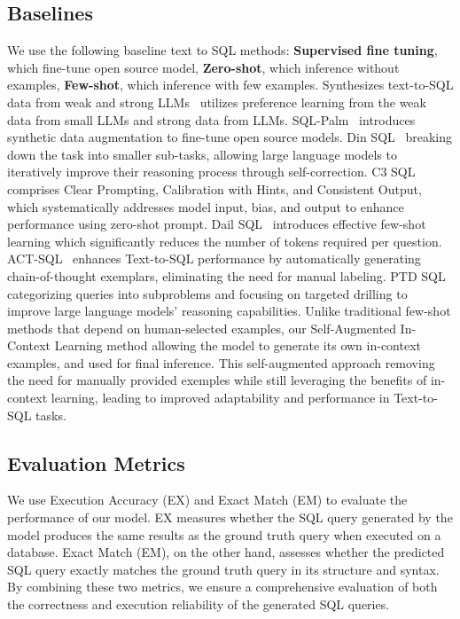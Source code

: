 \subsection{Baselines}
We use the following baseline text to SQL methods: \textbf{Supervised fine tuning}, which fine-tune open source model, \textbf{Zero-shot}, which inference without examples, \textbf{Few-shot}, which inference with few examples. Synthesizes text-to-SQL data from weak and strong LLMs~\cite{synthesize} utilizes preference learning from the weak data from small LLMs and strong data from LLMs. SQL-Palm~\cite{palm-sql} introduces synthetic data augmentation to fine-tune open source models. Din SQL~\cite{din} breaking down the task into smaller sub-tasks, allowing large language models to iteratively improve their reasoning process through self-correction. C3 SQL~\cite{c3_zeroshot} comprises  Clear Prompting, Calibration with Hints, and Consistent Output, which systematically addresses model input, bias, and output to enhance performance using zero-shot prompt. Dail SQL~\cite{dail_sql} introduces effective few-shot learning which significantly reduces the number of tokens required per question. ACT-SQL~\cite{act_sql} enhances Text-to-SQL performance by automatically generating chain-of-thought exemplars, eliminating the need for manual labeling. PTD SQL~\cite{ptd} categorizing queries into subproblems and focusing on targeted drilling to improve large language models' reasoning capabilities. Unlike traditional few-shot methods that depend on human-selected examples, our Self-Augmented In-Context Learning method allowing the model to generate its own in-context examples, and used for final inference. This self-augmented approach removing the need for manually provided exemples while still leveraging the benefits of in-context learning, leading to improved adaptability and performance in Text-to-SQL tasks.



\subsection{Evaluation Metrics}
We use Execution Accuracy (EX) and Exact Match (EM) to evaluate the performance of our model. EX measures whether the SQL query generated by the model produces the same results as the ground truth query when executed on a database. Exact Match (EM), on the other hand, assesses whether the predicted SQL query exactly matches the ground truth query in its structure and syntax. By combining these two metrics, we ensure a comprehensive evaluation of both the correctness and execution reliability of the generated SQL queries.

